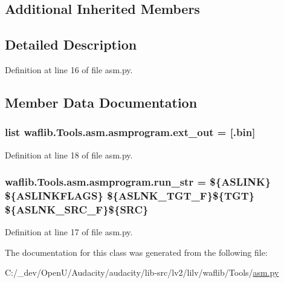 \subsection*{Additional Inherited Members}


\subsection{Detailed Description}


Definition at line 16 of file asm.\+py.



\subsection{Member Data Documentation}
\subsubsection[{\texorpdfstring{ext\+\_\+out}{ext_out}}]{\setlength{\rightskip}{0pt plus 5cm}list waflib.\+Tools.\+asm.\+asmprogram.\+ext\+\_\+out = \mbox{[}\textquotesingle{}.bin\textquotesingle{}\mbox{]}\hspace{0.3cm}{\ttfamily [static]}}\hypertarget{classwaflib_1_1_tools_1_1asm_1_1asmprogram_a0edab3f700809632cca7fa5c80892c36}{}\label{classwaflib_1_1_tools_1_1asm_1_1asmprogram_a0edab3f700809632cca7fa5c80892c36}


Definition at line 18 of file asm.\+py.

\subsubsection[{\texorpdfstring{run\+\_\+str}{run_str}}]{ waflib.\+Tools.\+asm.\+asmprogram.\+run\+\_\+str = \textquotesingle{}\$\{A\+S\+L\+I\+NK\} \$\{A\+S\+L\+I\+N\+K\+F\+L\+A\+GS\} \$\{A\+S\+L\+N\+K\+\_\+\+T\+G\+T\+\_\+F\}\$\{T\+GT\} \$\{A\+S\+L\+N\+K\+\_\+\+S\+R\+C\+\_\+F\}\$\{S\+RC\}\textquotesingle{}\hspace{0.3cm}{\ttfamily [static]}}\hypertarget{classwaflib_1_1_tools_1_1asm_1_1asmprogram_a30b2e1186a342dd6108a1148f4987695}{}\label{classwaflib_1_1_tools_1_1asm_1_1asmprogram_a30b2e1186a342dd6108a1148f4987695}


Definition at line 17 of file asm.\+py.



The documentation for this class was generated from the following file\+:\begin{DoxyCompactItemize}
\item 
C\+:/\+\_\+dev/\+Open\+U/\+Audacity/audacity/lib-\/src/lv2/lilv/waflib/\+Tools/\hyperlink{lilv_2waflib_2_tools_2asm_8py}{asm.\+py}\end{DoxyCompactItemize}
